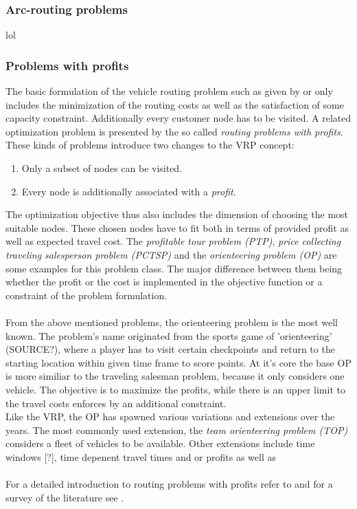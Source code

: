 \subsubsection{Arc-routing problems}

lol

\subsubsection{Problems with profits}

The basic formulation of the vehicle routing problem such as given by \cite{dantzig_truck_1959} or \cite{golden_fleet_1984} only includes the minimization of the routing costs as well as the satisfaction of some capacity constraint. Additionally every customer node has to be visited. A related optimization problem is presented by the so called \textit{routing problems with profits}. These kinds of problems introduce two changes to the VRP concept:
\begin{enumerate}
\item Only a subset of nodes can be visited.
\item Every node is additionally associated with a \textit{profit}.
\end{enumerate}
The optimization objective thus also includes the dimension of choosing the most suitable nodes. These chosen nodes have to fit both in terms of provided profit as well as expected travel cost. The \textit{profitable tour problem (PTP)}, \textit{price collecting traveling salesperson problem (PCTSP)} and the \textit{orienteering problem (OP)} are some examples for this problem class. The major difference between them being whether the profit or the cost is implemented in the objective function or a constraint of the problem formulation. \cite{vansteenwegen_orienteering_2019}\\ \\
From the above mentioned problems, the orienteering problem is the most well known. The problem's name originated from the sports game of 'orienteering' (SOURCE?), where a player has to visit certain checkpoints and return to the starting location within given time frame to score points. At it's core the base OP is more similiar to the traveling salesman problem, because it only considers one vehicle. The objective is to maximize the profits, while there is an upper limit to the travel costs enforces by an additional constraint.\\
Like the VRP, the OP has spawned various variations and extensions over the years. The most commonly used extension, the \textit{team orienteering problem (TOP)} considers a fleet of vehicles to be available. Other extensions include time windows [?], time depenent travel times and or profits as well as \\ \\
For a detailed introduction to routing problems with profits refer to \cite{vansteenwegen_orienteering_2019} and for a survey of the literature see \cite{vansteenwegen_orienteering_2011}.


